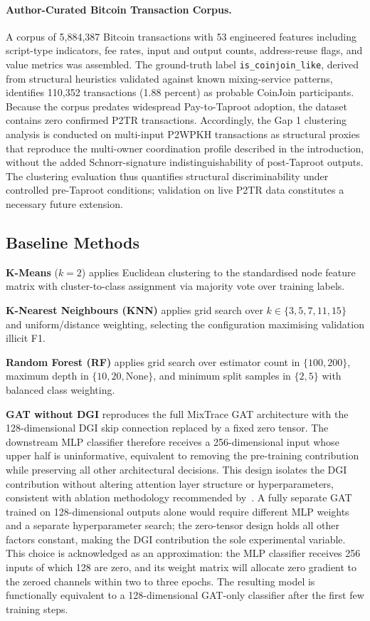 \documentclass[12pt,a4paper]{article}
\begin{document}
\paragraph{Author-Curated Bitcoin Transaction Corpus.}
A corpus of 5,884,387 Bitcoin transactions with 53
engineered features including script-type indicators,
fee rates, input and output counts, address-reuse flags,
and value metrics was assembled. The ground-truth label
\texttt{is\_coinjoin\_like}, derived from structural
heuristics validated against known mixing-service patterns,
identifies 110,352 transactions (1.88 percent) as probable
CoinJoin participants. Because the corpus predates
widespread Pay-to-Taproot adoption, the dataset contains
zero confirmed P2TR transactions. Accordingly, the Gap 1
clustering analysis is conducted on multi-input P2WPKH
transactions as structural proxies that reproduce the
multi-owner coordination profile described in the
introduction, without the added Schnorr-signature
indistinguishability of post-Taproot outputs. The
clustering evaluation thus quantifies structural
discriminability under controlled pre-Taproot conditions;
validation on live P2TR data constitutes a necessary
future extension.

\subsection{Baseline Methods}

\textbf{K-Means} ($k=2$) applies Euclidean clustering to
the standardised node feature matrix with cluster-to-class
assignment via majority vote over training labels.

\textbf{K-Nearest Neighbours (KNN)} applies grid search
over $k \in \{3,5,7,11,15\}$ and uniform/distance
weighting, selecting the configuration maximising
validation illicit F1.

\textbf{Random Forest (RF)} applies grid search over
estimator count in $\{100,200\}$, maximum depth in
$\{10,20,\text{None}\}$, and minimum split samples in
$\{2,5\}$ with balanced class weighting.

\textbf{GAT without DGI} reproduces the full MixTrace
GAT architecture with the 128-dimensional DGI skip
connection replaced by a fixed zero tensor. The
downstream MLP classifier therefore receives a 256-dimensional
input whose upper half is uninformative, equivalent to
removing the pre-training contribution while preserving
all other architectural decisions. This design isolates
the DGI contribution without altering attention layer
structure or hyperparameters, consistent with ablation
methodology recommended by~\citet{motie2024}. A fully
separate GAT trained on 128-dimensional outputs alone
would require different MLP weights and a separate
hyperparameter search; the zero-tensor design holds all
other factors constant, making the DGI contribution the
sole experimental variable. This choice is acknowledged
as an approximation: the MLP classifier receives 256
inputs of which 128 are zero, and its weight matrix will
allocate zero gradient to the zeroed channels within two
to three epochs. The resulting model is functionally
equivalent to a 128-dimensional GAT-only classifier
after the first few training steps.
\end{document}
